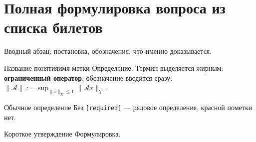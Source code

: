 %
%

\section{Полная формулировка вопроса из списка билетов}

Вводный абзац: постановка, обозначения, что именно доказывается.

\begin{Definition}[required]{Название понятия}{имя-метки}
	Определение. Термин выделяется жирным: \textbf{ограниченный оператор};
	обозначение вводится сразу: $\|\mathcal{A}\| := \sup_{\|x\|_X \le 1}\|\mathcal{A}x\|_Y$.
\end{Definition}

\begin{Definition}{Обычное определение}{}
	Без \verb|[required]| — рядовое определение, красной пометки нет.
\end{Definition}

\begin{Statement}{Короткое утверждение}{}
	Формулировка.
\end{Statement}

